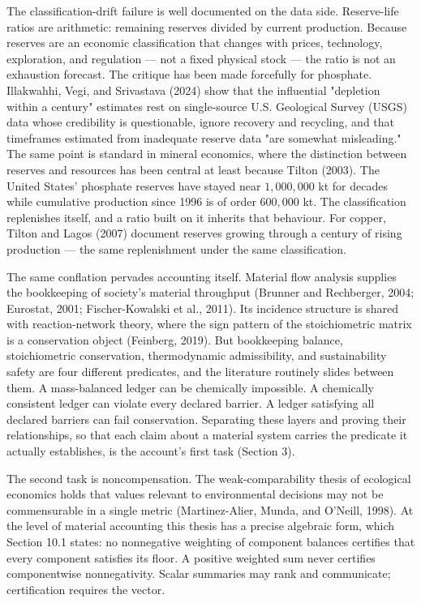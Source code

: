 \documentclass[11pt]{article}
\begin{document}
The classification-drift failure is well documented on the data side. Reserve-life ratios are arithmetic: remaining reserves divided by current production. Because reserves are an economic classification that changes with prices, technology, exploration, and regulation --- not a fixed physical stock --- the ratio is not an exhaustion forecast. The critique has been made forcefully for phosphate. Illakwahhi, Vegi, and Srivastava (2024) show that the influential "depletion within a century" estimates rest on single-source U.S. Geological Survey (USGS) data whose credibility is questionable, ignore recovery and recycling, and that timeframes estimated from inadequate reserve data "are somewhat misleading." The same point is standard in mineral economics, where the distinction between reserves and resources has been central at least because Tilton (2003). The United States' phosphate reserves have stayed near \(1{,}000{,}000\) kt for decades while cumulative production since 1996 is of order \(600{,}000\) kt. The classification replenishes itself, and a ratio built on it inherits that behaviour. For copper, Tilton and Lagos (2007) document reserves growing through a century of rising production --- the same replenishment under the same classification.

The same conflation pervades accounting itself. Material flow analysis supplies the bookkeeping of society's material throughput (Brunner and Rechberger, 2004; Eurostat, 2001; Fischer-Kowalski et al., 2011). Its incidence structure is shared with reaction-network theory, where the sign pattern of the stoichiometric matrix is a conservation object (Feinberg, 2019). But bookkeeping balance, stoichiometric conservation, thermodynamic admissibility, and sustainability safety are four different predicates, and the literature routinely slides between them. A mass-balanced ledger can be chemically impossible. A chemically consistent ledger can violate every declared barrier. A ledger satisfying all declared barriers can fail conservation. Separating these layers and proving their relationships, so that each claim about a material system carries the predicate it actually establishes, is the account's first task (Section 3).

The second task is noncompensation. The weak-comparability thesis of ecological economics holds that values relevant to environmental decisions may not be commensurable in a single metric (Martinez-Alier, Munda, and O'Neill, 1998). At the level of material accounting this thesis has a precise algebraic form, which Section 10.1 states: no nonnegative weighting of component balances certifies that every component satisfies its floor. A positive weighted sum never certifies componentwise nonnegativity. Scalar summaries may rank and communicate; certification requires the vector.
\end{document}
